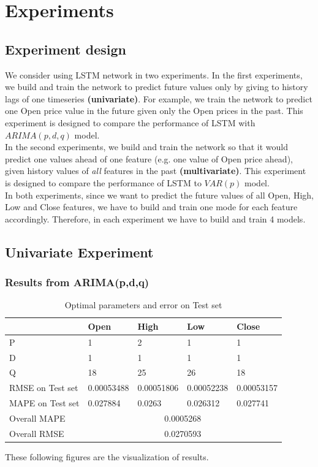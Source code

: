 \documentclass[11pt]{article}
\begin{document}

\section{Experiments}
\subsection{Experiment design}
We consider using LSTM network in two experiments. In the first experiments, we
build and train the network to predict future values only by giving to history
lags of one timeseries \textbf{(univariate)}. For example, we train the network
to predict one Open price value in the future given only the Open prices in the
past. This experiment is designed to compare the performance of LSTM with
$ARIMA(p, d, q)$ model.\\
In the second experiments, we build and train the network so that it would
predict one values ahead of one feature (e.g. one value of Open price ahead),
given history values of \textit{all} features in the past
\textbf{(multivariate)}. This experiment is
designed to compare the performance of LSTM to $VAR(p)$ model.\\
In both experiments, since we want to predict the future values of all Open,
High, Low and Close features, we have to build and train one mode for each
feature accordingly. Therefore, in each experiment we have to build and train 4
models.

\subsection{Univariate Experiment}
\subsubsection{Results from ARIMA(p,d,q)}

\begin{table}[H]
  \centering
\begin{tabular}{|l|l|l|l|l|}
  \hline
  & Open        & High       & Low        & Close      \\ \hline
  P                & 1           & 2          & 1          & 1          \\ \hline
  D                & 1           & 1          & 1          & 1          \\ \hline
  Q                & 18          & 25         & 26         & 18         \\ \hline
  RMSE on Test set & 0.00053488  & 0.00051806 & 0.00052238 & 0.00053157 \\ \hline
  MAPE on Test set & 0.027884    & 0.0263     & 0.026312   & 0.027741   \\ \hline
  Overall MAPE     & \multicolumn{4}{c|}{0.0005268}                     \\ \hline
  Overall RMSE     & \multicolumn{4}{c|}{0.0270593}                     \\ \hline
\end{tabular}
\caption{Optimal parameters and error on Test set}
\end{table}
These following figures are the visualization of results.
\end{document}
